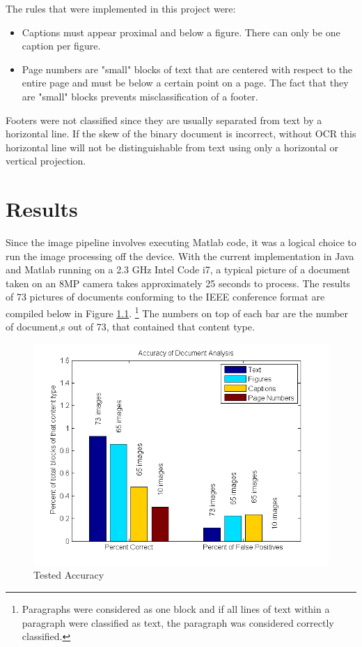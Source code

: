 \documentclass{report}
\begin{document}
The rules that were implemented in this project were:

\begin{itemize}
\item Captions must appear proximal and below a figure. There can only be one caption per figure.
\item Page numbers are "small" blocks of text that are centered with respect to the entire page and must be below a certain point on a page. The fact that they are "small" blocks prevents misclassification of a footer.
\end{itemize}

Footers were not classified since they are usually separated from text by a horizontal line. If the skew of the binary document is incorrect, without OCR this horizontal line will not be distinguishable from text using only a horizontal or vertical projection.

\chapter{Results}
Since the image pipeline involves executing Matlab code, it was a logical choice to run the image processing off the device. With the current implementation in Java and Matlab running on a 2.3 GHz Intel Code i7, a typical picture of a document taken on an 8MP camera takes approximately 25 seconds to process. The results of 73 pictures of documents conforming to the IEEE conference format are compiled below in Figure \ref{accuracy}. \footnote{Paragraphs were considered as one block and if all lines of text within a paragraph were classified as text, the paragraph was considered correctly classified.} The numbers on top of each bar are the number of document,s out of 73, that contained that content type.
\begin{figure}[h]
\centering
\includegraphics[width = 0.8\columnwidth]{accuracy_report2.png}
\caption{Tested Accuracy}
\label{accuracy}
\end{figure}
\end{document}
